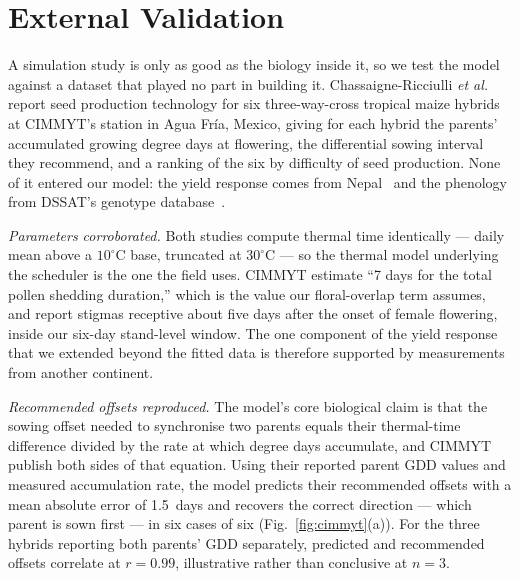 
\section{External Validation}
\label{sec:validation}

A simulation study is only as good as the biology inside it, so we test the
model against a dataset that played no part in building it.
Chassaigne-Ricciulli \textit{et al.}~\cite{chassaigne2021} report seed
production technology for six three-way-cross tropical maize hybrids at
CIMMYT's station in Agua Fr\'ia, Mexico, giving for each hybrid the parents'
accumulated growing degree days at flowering, the differential sowing
interval they recommend, and a ranking of the six by difficulty of seed
production. None of it entered our model: the yield response comes from
Nepal~\cite{marahatta2025} and the phenology from DSSAT's genotype
database~\cite{dssat}.

\textit{Parameters corroborated.} Both studies compute thermal time
identically --- daily mean above a $10^\circ$C base, truncated at
$30^\circ$C --- so the thermal model underlying the scheduler is the one the
field uses. CIMMYT estimate ``7 days for the total pollen shedding
duration,'' which is the value our floral-overlap term assumes, and report
stigmas receptive about five days after the onset of female flowering,
inside our six-day stand-level window. The one component of the yield
response that we extended beyond the fitted data is therefore supported by
measurements from another continent.

\textit{Recommended offsets reproduced.} The model's core biological claim is
that the sowing offset needed to synchronise two parents equals their
thermal-time difference divided by the rate at which degree days accumulate,
and CIMMYT publish both sides of that equation. Using their reported parent
GDD values and measured accumulation rate, the model predicts their
recommended offsets with a mean absolute error of 1.5~days and recovers the
correct direction --- which parent is sown first --- in six cases of six
(Fig.~\ref{fig:cimmyt}(a)). For the three hybrids reporting both parents'
GDD separately, predicted and recommended offsets correlate at $r = 0.99$,
illustrative rather than conclusive at $n = 3$.

